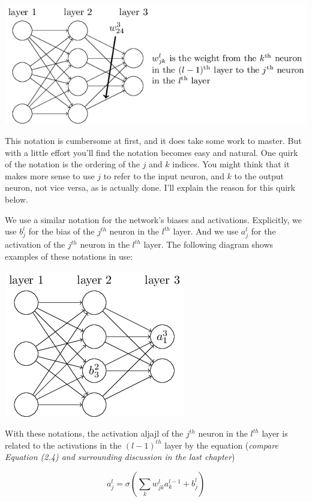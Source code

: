 \documentclass[a4paper,12pt]{report}%
\begin{document}
\begin{center}
 \includegraphics[width=0.95\linewidth]{images/tikz16.png}
\end{center}

This notation is cumbersome at first, and it does take some work to master. But with a little effort you'll find the notation becomes easy and natural. One quirk of the notation is the ordering of the $j$ and $k$ indices. You might think that it makes more sense to use $j$ to refer to the input neuron, and $k$ to the output neuron, not vice versa, as is actually done. I'll explain the reason for this quirk below.

We use a similar notation for the network's biases and activations. Explicitly, we use $b^{l}_{j}$ for the bias of the $j^{th}$ neuron in the $l^{th}$ layer. And we use $a^{l}_{j}$ for the activation of the $j^{th}$ neuron in the $l^{th}$ layer. The following diagram shows examples of these notations in use:

\begin{center}
 \includegraphics[width=0.4\linewidth]{images/tikz17.png}
\end{center}

With these notations, the activation aljajl of the $j^{th}$ neuron in the $l^{th}$ layer is related to the activations in the $(l−1)^{th}$ layer by the equation ({\it compare Equation (2.4) and surrounding discussion in the last chapter})

\begin{equation}
 a^{l}_{j} = \sigma \left( \sum_{k} w^{l}_{jk}  a^{l-1}_{k} + b^{l}_{j} \right)
\end{equation}
\end{document}

